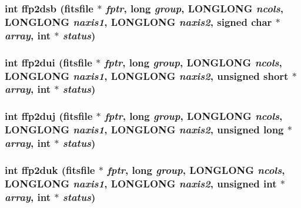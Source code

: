 \subsubsection{\setlength{\rightskip}{0pt plus 5cm}int ffp2dsb (\bf{fitsfile} $\ast$ {\em fptr}, long {\em group}, \bf{LONGLONG} {\em ncols}, \bf{LONGLONG} {\em naxis1}, \bf{LONGLONG} {\em naxis2}, signed char $\ast$ {\em array}, int $\ast$ {\em status})}\label{test_2roimasker_2fitsio_8h_e6a70017924d08f130af5f122d7b610e}


\subsubsection{\setlength{\rightskip}{0pt plus 5cm}int ffp2dui (\bf{fitsfile} $\ast$ {\em fptr}, long {\em group}, \bf{LONGLONG} {\em ncols}, \bf{LONGLONG} {\em naxis1}, \bf{LONGLONG} {\em naxis2}, unsigned short $\ast$ {\em array}, int $\ast$ {\em status})}\label{test_2roimasker_2fitsio_8h_35a8533785911cfd707b4ec578f431b0}


\subsubsection{\setlength{\rightskip}{0pt plus 5cm}int ffp2duj (\bf{fitsfile} $\ast$ {\em fptr}, long {\em group}, \bf{LONGLONG} {\em ncols}, \bf{LONGLONG} {\em naxis1}, \bf{LONGLONG} {\em naxis2}, unsigned long $\ast$ {\em array}, int $\ast$ {\em status})}\label{test_2roimasker_2fitsio_8h_894a5478ff80f7822a394abc4cac5db3}


\subsubsection{\setlength{\rightskip}{0pt plus 5cm}int ffp2duk (\bf{fitsfile} $\ast$ {\em fptr}, long {\em group}, \bf{LONGLONG} {\em ncols}, \bf{LONGLONG} {\em naxis1}, \bf{LONGLONG} {\em naxis2}, unsigned int $\ast$ {\em array}, int $\ast$ {\em status})}\label{test_2roimasker_2fitsio_8h_7daa3c68214e4bf5e9510489d23c8344}


